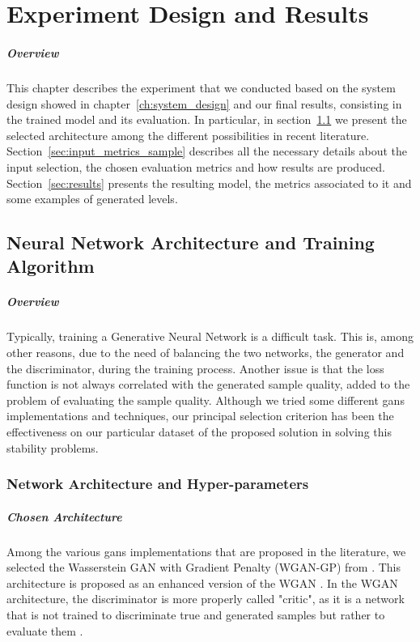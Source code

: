 \chapter{Experiment Design and Results}
\paragraph{Overview} %
 This chapter describes the experiment that we conducted based on the system design showed in chapter~\ref{ch:system_design} and our final results, consisting in the trained model and its evaluation. In particular, in section~\ref{sec:nn} we present the selected architecture among the different possibilities in recent literature. Section~\ref{sec:input_metrics_sample} describes all the necessary details about the input selection, the chosen evaluation metrics and how results are produced. Section~\ref{sec:results} presents the resulting model, the metrics associated to it and some examples of generated levels. 
\section{Neural Network Architecture and Training Algorithm}
\label{sec:nn}
\paragraph{Overview} Typically, training a Generative Neural Network is a difficult task. This is, among other reasons, due to the need of balancing the two networks, the generator and the discriminator, during the training process. Another issue is that the loss function is not always correlated with the generated sample quality, added to the problem of evaluating the sample quality. %
 Although we tried some different \glspl{gan} implementations and techniques, our principal selection criterion has been the effectiveness on our particular dataset of the proposed solution in solving this stability problems.
\subsection{Network Architecture and Hyper-parameters}
\label{sec:networkarch}

\paragraph{Chosen Architecture} Among the various \glspl{gan} implementations that are proposed in the literature, we selected the Wasserstein GAN with Gradient Penalty \cite{wgangp} (WGAN-GP) from \citeauthor{wgangp}. This architecture is proposed as an enhanced version of the WGAN \cite{wgan}. In the WGAN architecture, the discriminator is more properly called "critic", as it is a network that is not trained to discriminate true and generated samples but rather to evaluate them \cite[section 2.2, p.~2]{wgangp}.



